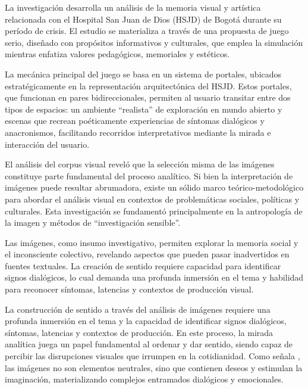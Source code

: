 
La investigación desarrolla un análisis de la memoria visual y artística relacionada con el Hospital San Juan de Dios (HSJD) de Bogotá durante su período de crisis. El estudio se materializa a través de una propuesta de juego serio, diseñado con propósitos informativos y culturales, que emplea la simulación mientras enfatiza valores pedagógicos, memoriales y estéticos.

La mecánica principal del juego se basa en un sistema de portales, ubicados estratégicamente en la representación arquitectónica del HSJD. Estos portales, que funcionan en pares bidireccionales, permiten al usuario transitar entre dos tipos de espacios: un ambiente ``realista'' de exploración en mundo abierto y escenas que recrean poéticamente experiencias de síntomas dialógicos y anacronismos, facilitando recorridos interpretativos mediante la mirada e interacción del usuario.

El análisis del corpus visual reveló que la selección misma de las imágenes constituye parte fundamental del proceso analítico. Si bien la interpretación de imágenes puede resultar abrumadora, existe un sólido marco teórico-metodológico para abordar el análisis visual en contextos de problemáticas sociales, políticas y culturales. Esta investigación se fundamentó principalmente en la antropología de la imagen y métodos de ``investigación sensible''.

Las imágenes, como insumo investigativo, permiten explorar la memoria social y el inconsciente colectivo, revelando aspectos que pueden pasar inadvertidos en fuentes textuales. La creación de sentido requiere capacidad para identificar signos dialógicos, lo cual demanda una profunda inmersión en el tema y habilidad para reconocer síntomas, latencias y contextos de producción visual.


La construcción de sentido a través del análisis de imágenes requiere una profunda inmersión en el tema y la capacidad de identificar signos dialógicos, síntomas, latencias y contextos de producción. En este proceso, la mirada analítica juega un papel fundamental al ordenar y dar sentido, siendo capaz de percibir las disrupciones visuales que irrumpen en la cotidianidad. Como señala \parencite{Didi-Huberman2011}, las imágenes no son elementos neutrales, sino que contienen deseos y estimulan la imaginación, materializando complejos entramados dialógicos y emocionales.

